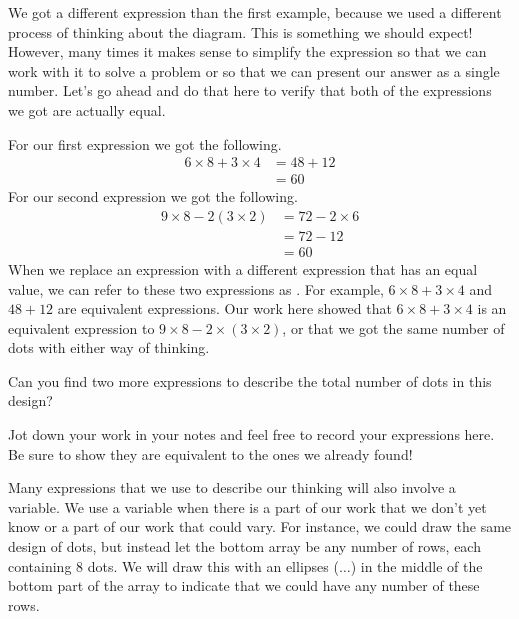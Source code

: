 \documentclass{ximera}
\begin{document}
We got a different expression than the first example, because we used a different process of thinking about the diagram. This is something we should expect! However, many times it makes sense to simplify the expression so that we can work with it to solve a problem or so that we can present our answer as a single number. Let's go ahead and do that here to verify that both of the expressions we got are actually equal. 

For our first expression we got the following.
\begin{align*}
6 \times 8 + 3 \times 4 &= 48 + 12 \\
&= 60
\end{align*}
For our second expression we got the following.
\begin{align*}
9 \times 8 - 2 \left ( 3 \times 2 \right ) &=  72 - 2\times 6\\
&= 72 - 12 \\
&= 60
\end{align*}
When we replace an expression with a different expression that has an equal value, we can refer to these two expressions as . For example, $6 \times 8 + 3 \times 4$ and $48 + 12$ are equivalent expressions. Our work here showed that $6 \times 8 + 3 \times 4$ is an equivalent expression to $9 \times 8 - 2\times (3 \times 2)$, or that we got the same number of dots with either way of thinking.

\begin{question}
Can you find two more expressions to describe the total number of dots in this design?
\begin{freeResponse}
Jot down your work in your notes and feel free to record your expressions here. Be sure to show they are equivalent to the ones we already found!
\end{freeResponse}
\end{question}

Many expressions that we use to describe our thinking will also involve a variable. We use a variable when there is a part of our work that we don't yet know or a part of our work that could vary. For instance, we could draw the same design of dots, but instead let the bottom array be any number of rows, each containing $8$ dots. We will draw this with an ellipses ($\dots$) in the middle of the bottom part of the array to indicate that we could have any number of these rows.

\begin{image}
\end{image}
\end{document}
